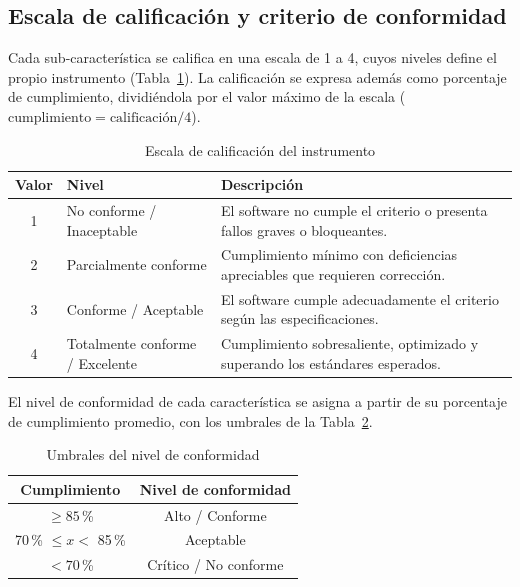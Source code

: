\documentclass[conference]{IEEEtran}
\begin{document}
\subsection{Escala de calificación y criterio de conformidad}

Cada sub-característica se califica en una escala de 1 a 4, cuyos niveles
define el propio instrumento (Tabla~\ref{tab:escala-iso}). La
calificación se expresa además como porcentaje de cumplimiento, dividiéndola
por el valor máximo de la escala ($\text{cumplimiento} = \text{calificación}/4$).

\begin{table}[htbp]
\caption{Escala de calificación del instrumento}
\label{tab:escala-iso}
\centering
\footnotesize
\begin{tabular}{|c|p{2.3cm}|p{4.2cm}|}
\hline
\textbf{Valor} & \textbf{Nivel} & \textbf{Descripción} \\
\hline
1 & No conforme / Inaceptable & El software no cumple el criterio o presenta fallos graves o bloqueantes. \\
\hline
2 & Parcialmente conforme & Cumplimiento mínimo con deficiencias apreciables que requieren corrección. \\
\hline
3 & Conforme / Aceptable & El software cumple adecuadamente el criterio según las especificaciones. \\
\hline
4 & Totalmente conforme / Excelente & Cumplimiento sobresaliente, optimizado y superando los estándares esperados. \\
\hline
\end{tabular}
\end{table}

El nivel de conformidad de cada característica se asigna a partir de su
porcentaje de cumplimiento promedio, con los umbrales de la
Tabla~\ref{tab:umbrales-iso}.

\begin{table}[htbp]
\caption{Umbrales del nivel de conformidad}
\label{tab:umbrales-iso}
\centering
\footnotesize
\begin{tabular}{|c|c|}
\hline
\textbf{Cumplimiento} & \textbf{Nivel de conformidad} \\
\hline
$\geq 85$\,\% & Alto / Conforme \\
\hline
70\,\% $\leq x <$ 85\,\% & Aceptable \\
\hline
$< 70$\,\% & Crítico / No conforme \\
\hline
\end{tabular}
\end{table}
\end{document}

